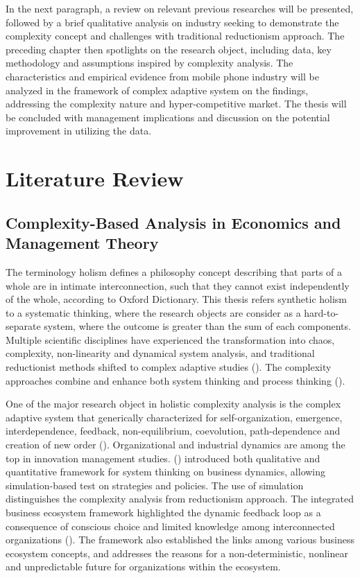 \documentclass[utf8,english]{gradu3}
\begin{document}
In the next paragraph, a review on relevant previous researches will be presented, followed by a brief qualitative analysis on industry seeking to demonstrate the complexity concept and challenges with traditional reductionism approach. The preceding chapter then spotlights on the research object, including data, key methodology and assumptions inspired by complexity analysis. The characteristics and empirical evidence from mobile phone industry will be analyzed in the framework of complex adaptive system on the findings, addressing the complexity nature and hyper-competitive market. The thesis will be concluded with management implications and discussion on the potential improvement in utilizing the data.

\chapter{Literature Review}

\section{Complexity-Based Analysis in Economics and Management Theory}

The terminology holism defines a philosophy concept describing that parts of a whole are in intimate interconnection, such that they cannot exist independently of the whole, according to Oxford Dictionary. This thesis refers synthetic holism to a systematic thinking, where the research objects are consider as a hard-to-separate system, where the outcome is greater than the sum of each components. Multiple scientific disciplines have experienced the transformation into chaos, complexity, non-linearity and dynamical system analysis, and traditional reductionist methods shifted to complex adaptive studies (\cite{urry2005complexity}). The complexity approaches combine and enhance both system thinking and process thinking (\cite{thrift1999place}). 

One of the major research object in holistic complexity analysis is the complex adaptive system that generically characterized for self-organization, emergence, interdependence, feedback, non-equilibrium, coevolution, path-dependence and creation of new order (\cite{mitleton2003complex}). Organizational and industrial dynamics are among the top in innovation management studies. \citeauthor{jung2014structure} (\citeyear{jung2014structure}) introduced both qualitative and quantitative framework for system thinking on business dynamics, allowing simulation-based test on strategies and policies. The use of simulation distinguishes the complexity analysis from reductionism approach. The integrated business ecosystem framework highlighted the dynamic feedback loop as a consequence of conscious choice and limited knowledge among interconnected organizations (\cite{peltoniemi2006preliminary}). The framework also established the links among various business ecosystem concepts, and addresses the reasons for a non-deterministic, nonlinear and unpredictable future for organizations within the ecosystem.
\end{document}
